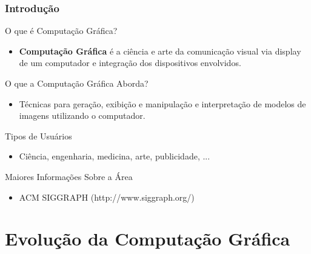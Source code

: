 \documentclass{beamer}
\begin{document}
\begin{frame}
\frametitle{Introdução}

	
	\begin{block}{O que é Computação Gráfica?}
		\begin{itemize}
			\item<1-> \textbf{Computação Gráfica} é a ciência e arte da comunicação visual via display de um computador e integração dos dispositivos envolvidos.
		\end{itemize}
	\end{block}

	\begin{block}{O que a Computação Gráfica Aborda?}
		\begin{itemize}
			\item<2-> Técnicas para geração, exibição e manipulação e interpretação de modelos de imagens utilizando o computador.
		\end{itemize}
	\end{block}
	
	\begin{block}{Tipos de Usuários}
		\begin{itemize}
				\item<3-> Ciência, engenharia, medicina, arte, publicidade, ...
		\end{itemize}
	\end{block}	
	
	\begin{block}{Maiores Informações Sobre a Área} 
		\begin{itemize}
				\item<4-> ACM SIGGRAPH (http://www.siggraph.org/)
		\end{itemize}
	\end{block}
	
	
\end{frame}



\section{Evolução da Computação Gráfica}
\end{document}
